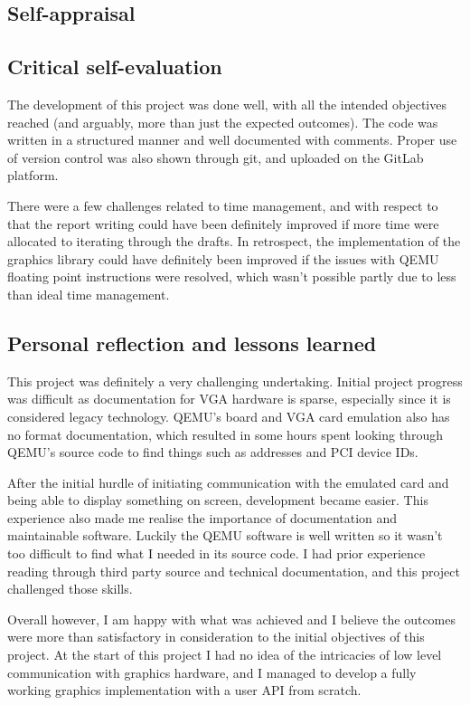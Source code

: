 \begin{appendices}

%
%
\chapter{Self-appraisal}

\section{Critical self-evaluation}
The development of this project was done well, with all the intended objectives reached
(and arguably, more than just the expected outcomes). The code was written in a structured manner
and well documented with comments. Proper use of version control was also shown through 
git, and uploaded on the GitLab platform.

There were a few challenges related to time management, and with respect to that
the report writing could have been definitely improved if more time were allocated
to iterating through the drafts. In retrospect, the implementation of the
graphics library could have definitely been improved if the issues with QEMU
floating point instructions were resolved, which wasn't possible partly due to 
less than ideal time management.

\section{Personal reflection and lessons learned}
This project was definitely a very challenging undertaking. Initial project progress
was difficult as documentation for VGA hardware is sparse, especially since it is 
considered legacy technology. QEMU's board and VGA card emulation also has no 
format documentation, which resulted in some hours spent looking through QEMU's
source code to find things such as addresses and PCI device IDs.

After the initial hurdle of initiating communication with the emulated card and
being able to display something on screen, development became easier. This experience
also made me realise the importance of documentation and maintainable software. Luckily
the QEMU software is well written so it wasn't too difficult to find what I needed in its
source code. I had prior experience reading through third party source and technical
documentation, and this project challenged those skills.

Overall however, I am happy with what was achieved and I believe the outcomes were
more than satisfactory in consideration to the initial objectives of this project.
At the start of this project I had no idea of the intricacies of low level communication
with graphics hardware, and I managed to develop a fully working graphics implementation
with a user API from scratch.


\end{appendices}
